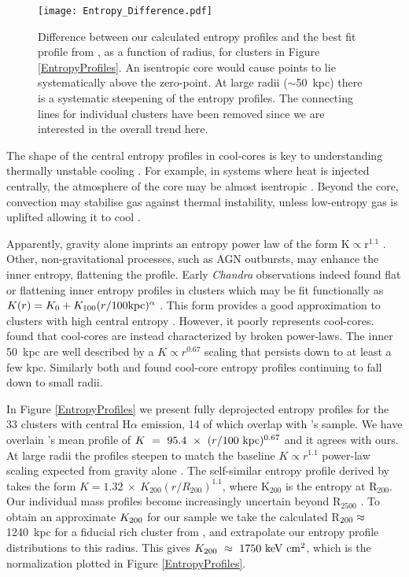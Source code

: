 \documentclass[twocolumn]{aastex6}
\begin{document}
\begin{figure}
	\texttt{[image: Entropy\_Difference.pdf]}
    \caption{Difference between our calculated entropy profiles and the best fit profile from \citet[][]{Panagoulia14a}, as a function of radius, for clusters in Figure \ref{EntropyProfiles}.  An isentropic core would cause points to lie systematically above the zero-point.  At large radii ($\sim$50~kpc) there is a systematic steepening of the entropy profiles.  The connecting lines for individual clusters have been removed since we are interested in the overall trend here.}
    \label{EntropyDifference}
\end{figure}


The shape of the central entropy profiles in cool-cores is key to understanding thermally unstable cooling \cite[][]{Sharma12b,Voit16}.  For example, in systems where heat is injected centrally, the atmosphere of the core may be almost isentropic \cite[][]{Voit16}.  Beyond the core, convection may stabilise gas against thermal instability, unless low-entropy gas is uplifted allowing it to cool \cite[][]{McNamara16}.

Apparently, gravity alone imprints an entropy power law of the form K$\propto$r$^{1.1}$ \cite[e.g.][]{Tozzi01,Voit05a}.  Other, non-gravitational processes, such as AGN outbursts, may enhance the inner entropy, flattening the profile. Early {\it Chandra} observations indeed found flat or flattening inner entropy profiles in clusters \cite[e.g.][]{David96,Ponman99,David01,Ponman03} which may be fit functionally as $K(r) = K_{0} + K_{100} (r / 100 {\rm kpc})^{\alpha}$ \cite[][]{Donahue05,Donahue06,Cavagnolo08,Cavagnolo09,Voit16}.  This form provides a good approximation to clusters with high central entropy \cite[][]{Cavagnolo09}.  However, it poorly represents cool-cores.  \citet[][]{Panagoulia14a} found that cool-cores are instead characterized by broken power-laws.  The inner 50~kpc are well described by a $K \propto r^{0.67}$ scaling that persists down to at least a few kpc.  Similarly both \citet[][]{Lakhchaura16} and \citet[][]{Hogan17} found cool-core entropy profiles continuing to fall down to small radii.

In Figure \ref{EntropyProfiles} we present fully deprojected entropy profiles for the 33 clusters with central H$\alpha$ emission, 14 of which overlap with \citet[][]{Panagoulia14a}'s sample.  We have overlain \citet[][]{Panagoulia14a}'s mean profile of $K~=~95.4~\times~(r/100~{\rm kpc})^{0.67}$ and it agrees with ours. At large radii the profiles steepen to match the baseline $K \propto r^{1.1}$ power-law scaling expected from gravity alone \cite[e.g.][]{Tozzi01,Voit05a}. The self-similar entropy profile derived by \citet[][]{Voit05a} takes the form  $K = 1.32~\times~K_{200}(r/R_{200})^{1.1}$, where K$_{200}$ is the entropy at R$_{200}$.  Our individual mass profiles become increasingly uncertain beyond R$_{2500}$ \cite[][]{Hogan17}.  To obtain an approximate $K_{\rm 200}$ for our sample we take the calculated R$_{\rm 200}\approx$1240~kpc for a fiducial rich cluster from \citet[][]{Voit05a}, and extrapolate our entropy profile distributions to this radius.  This gives $K_{\rm 200}~\approx~1750~{\rm keV}~{\rm cm}^{2}$, which is the normalization plotted in Figure \ref{EntropyProfiles}.
\end{document}
